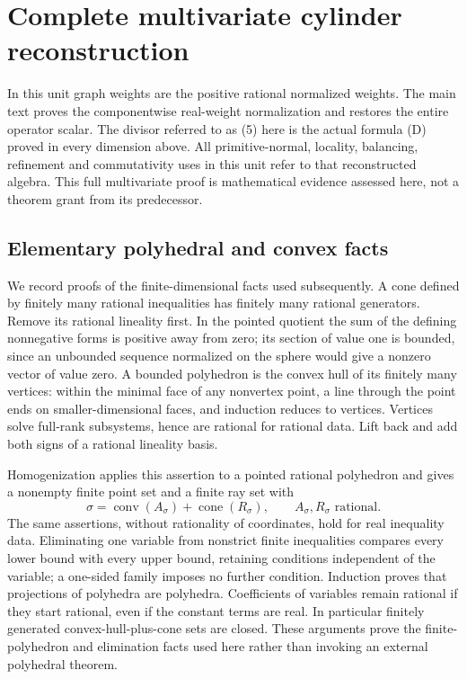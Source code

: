 \documentclass[
  11pt,
]{article}
\begin{document}
\section{Complete multivariate cylinder
reconstruction}\label{complete-multivariate-cylinder-reconstruction}

In this unit graph weights are the positive rational normalized weights.
The main text proves the componentwise real-weight normalization and
restores the entire operator scalar. The divisor referred to as (5) here
is the actual formula (D) proved in every dimension above. All
primitive-normal, locality, balancing, refinement and commutativity uses
in this unit refer to that reconstructed algebra. This full multivariate
proof is mathematical evidence assessed here, not a theorem grant from
its predecessor.

\subsection{Elementary polyhedral and convex
facts}\label{elementary-polyhedral-and-convex-facts}

We record proofs of the finite-dimensional facts used subsequently. A
cone defined by finitely many rational inequalities has finitely many
rational generators. Remove its rational lineality first. In the pointed
quotient the sum of the defining nonnegative forms is positive away from
zero; its section of value one is bounded, since an unbounded sequence
normalized on the sphere would give a nonzero vector of value zero. A
bounded polyhedron is the convex hull of its finitely many vertices:
within the minimal face of any nonvertex point, a line through the point
ends on smaller-dimensional faces, and induction reduces to vertices.
Vertices solve full-rank subsystems, hence are rational for rational
data. Lift back and add both signs of a rational lineality basis.

Homogenization applies this assertion to a pointed rational polyhedron
and gives a nonempty finite point set and a finite ray set with \[
 \sigma=\operatorname{conv}(A_\sigma)+\operatorname{cone}(R_\sigma),
                    \qquad A_\sigma,R_\sigma\text{ rational}.       \tag{4}
\] The same assertions, without rationality of coordinates, hold for
real inequality data. Eliminating one variable from nonstrict finite
inequalities compares every lower bound with every upper bound,
retaining conditions independent of the variable; a one-sided family
imposes no further condition. Induction proves that projections of
polyhedra are polyhedra. Coefficients of variables remain rational if
they start rational, even if the constant terms are real. In particular
finitely generated convex-hull-plus-cone sets are closed. These
arguments prove the finite-polyhedron and elimination facts used here
rather than invoking an external polyhedral theorem.
\end{document}
